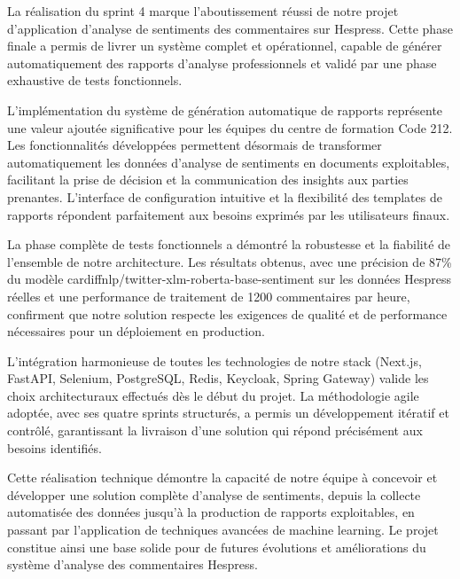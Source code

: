La réalisation du sprint 4 marque l'aboutissement réussi de notre projet d'application d'analyse de sentiments des commentaires sur Hespress. Cette phase finale a permis de livrer un système complet et opérationnel, capable de générer automatiquement des rapports d'analyse professionnels et validé par une phase exhaustive de tests fonctionnels.

L'implémentation du système de génération automatique de rapports représente une valeur ajoutée significative pour les équipes du centre de formation Code 212. Les fonctionnalités développées permettent désormais de transformer automatiquement les données d'analyse de sentiments en documents exploitables, facilitant la prise de décision et la communication des insights aux parties prenantes. L'interface de configuration intuitive et la flexibilité des templates de rapports répondent parfaitement aux besoins exprimés par les utilisateurs finaux.

La phase complète de tests fonctionnels a démontré la robustesse et la fiabilité de l'ensemble de notre architecture. Les résultats obtenus, avec une précision de 87\% du modèle cardiffnlp/twitter-xlm-roberta-base-sentiment sur les données Hespress réelles et une performance de traitement de 1200 commentaires par heure, confirment que notre solution respecte les exigences de qualité et de performance nécessaires pour un déploiement en production.

L'intégration harmonieuse de toutes les technologies de notre stack (Next.js, FastAPI, Selenium, PostgreSQL, Redis, Keycloak, Spring Gateway) valide les choix architecturaux effectués dès le début du projet. La méthodologie agile adoptée, avec ses quatre sprints structurés, a permis un développement itératif et contrôlé, garantissant la livraison d'une solution qui répond précisément aux besoins identifiés.

Cette réalisation technique démontre la capacité de notre équipe à concevoir et développer une solution complète d'analyse de sentiments, depuis la collecte automatisée des données jusqu'à la production de rapports exploitables, en passant par l'application de techniques avancées de machine learning. Le projet constitue ainsi une base solide pour de futures évolutions et améliorations du système d'analyse des commentaires Hespress.